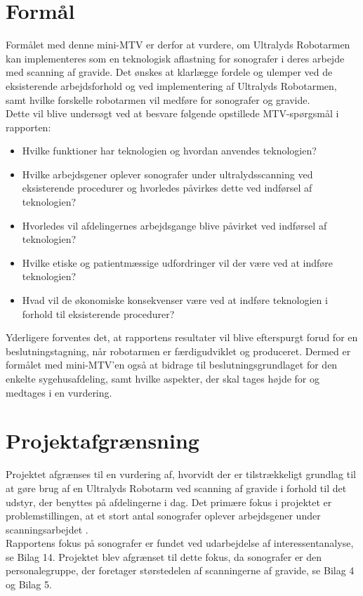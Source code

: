 
\section{Formål}
Formålet med denne mini-MTV er derfor at vurdere, om Ultralyds Robotarmen kan implementeres som en teknologisk aflastning for sonografer i deres arbejde med scanning af gravide. Det ønskes at klarlægge fordele og ulemper ved de eksisterende arbejdsforhold og ved implementering af Ultralyds Robotarmen, samt hvilke forskelle robotarmen vil medføre for sonografer og gravide. \\
Dette vil blive undersøgt ved at besvare følgende opstillede MTV-spørgsmål i rapporten:
\begin{itemize}
\item Hvilke funktioner har teknologien og hvordan anvendes teknologien?
\item Hvilke arbejdsgener oplever sonografer under ultralydsscanning ved eksisterende procedurer og hvorledes påvirkes dette ved indførsel af teknologien?
\item Hvorledes vil afdelingernes arbejdsgange blive påvirket ved indførsel af teknologien?
\item Hvilke etiske og patientmæssige udfordringer vil der være ved at indføre teknologien?
\item Hvad vil de økonomiske konsekvenser være ved at indføre teknologien i forhold til eksisterende procedurer?
\end{itemize}

Yderligere forventes det, at rapportens resultater vil blive efterspurgt forud for en beslutningstagning, når robotarmen er færdigudviklet og produceret. Dermed er formålet med mini-MTV’en også at bidrage til beslutningsgrundlaget for den enkelte sygehusafdeling, samt hvilke aspekter, der skal tages højde for og medtages i en vurdering.

\section{Projektafgrænsning}
Projektet afgrænses til en vurdering af, hvorvidt der er tilstrækkeligt grundlag til at gøre brug af en Ultralyds Robotarm ved scanning af gravide i forhold til det udstyr, der benyttes på afdelingerne i dag. Det primære fokus i projektet er problemstillingen, at et stort antal sonografer oplever arbejdsgener under scanningsarbejdet \cite{1}\cite{24}\cite{31}\cite{36}\cite{30}. \\
Rapportens fokus på sonografer er fundet ved udarbejdelse af interessentanalyse, se Bilag 14. Projektet blev afgrænset til dette fokus, da sonografer er den personalegruppe, der foretager størstedelen af scanningerne af gravide, se Bilag 4 og Bilag 5.

